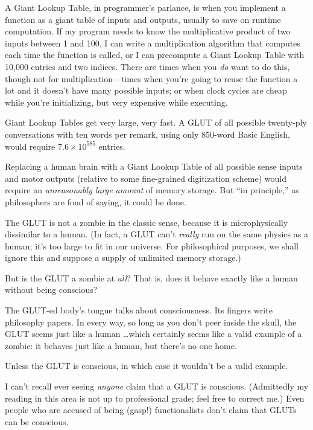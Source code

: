 {
 A Giant Lookup Table, in programmer's parlance, is
when you implement a function as a giant table of inputs and outputs,
usually to save on runtime computation. If my program needs to know the
multiplicative product of two inputs between 1 and 100, I can write a
multiplication algorithm that computes each time the function is
called, or I can precompute a Giant Lookup Table with 10,000 entries
and two indices. There are times when you \textit{do} want to do this,
though not for multiplication---times when you're going
to reuse the function a lot and it doesn't have many
possible inputs; or when clock cycles are cheap while
you're initializing, but very expensive while
executing.}

{
 Giant Lookup Tables get very large, very fast. A GLUT of all
possible twenty-ply conversations with ten words per remark, using only
850-word Basic English, would require $7.6 \times 10^{585}$ entries.}

{
 Replacing a human brain with a Giant Lookup Table of all possible
sense inputs and motor outputs (relative to some fine-grained
digitization scheme) would require an \textit{unreasonably large
amount} of memory storage. But ``in
principle,'' as philosophers are fond of saying, it
could be done.}

{
 The GLUT is not a zombie in the classic sense, because it is
microphysically dissimilar to a human. (In fact, a GLUT
can't \textit{really} run on the same physics as a
human; it's too large to fit in our universe. For
philosophical purposes, we shall ignore this and suppose a supply of
unlimited memory storage.)}

{
 But is the GLUT a zombie at \textit{all}? That is, does it behave
exactly like a human without being conscious?}

{
 The GLUT-ed body's tongue talks about
consciousness. Its fingers write philosophy papers. In every way, so
long as you don't peer inside the skull, the GLUT seems
just like a human \ldots which certainly seems like a valid example of a
zombie: it behaves just like a human, but there's no
one home.}

{
 Unless the GLUT is conscious, in which case it
wouldn't be a valid example.}

{
 I can't recall ever seeing \textit{anyone} claim
that a GLUT is conscious. (Admittedly my reading in this area is not up
to professional grade; feel free to correct me.) Even people who are
accused of being (gasp!) functionalists don't claim
that GLUTs can be conscious.}

